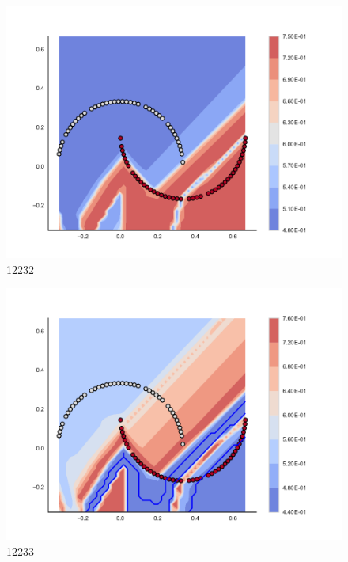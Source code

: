 \begin{subfigure}[b]{0.09\textwidth}
    \includegraphics[clip, trim=2.35cm 1.75cm 4.5cm 0cm,width=\textwidth]{img/convergence/12232.pdf}
    \caption{12232}
    \label{fig:convergence_12232}
\end{subfigure}
%
\begin{subfigure}[b]{0.09\textwidth}
    \includegraphics[clip, trim=2.35cm 1.75cm 4.5cm 0cm,width=\textwidth]{img/convergence/12233.pdf}
    \caption{12233}
    \label{fig:convergence_12233}
\end{subfigure}
%
